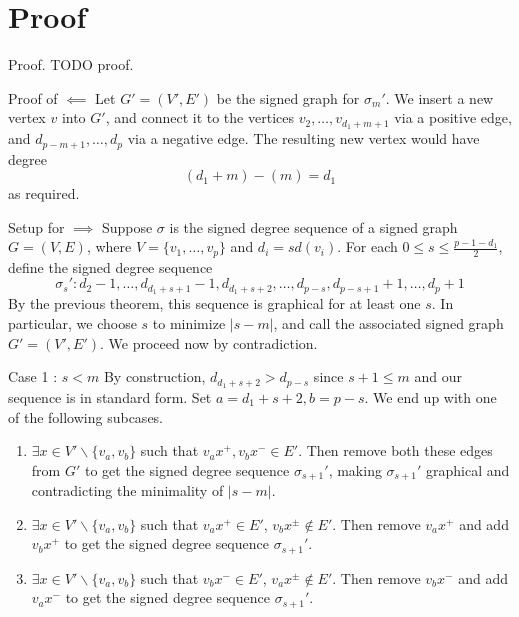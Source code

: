 \section{Proof}

\begin{frame}{Proof.}
	TODO proof.
\end{frame}

\begin{frame}{Proof of $\impliedby$}
	Let $G' = (V',E')$ be the signed graph for $\sigma_m'$. We insert a new vertex $v$ into $G'$, and connect it to the vertices $v_2,\dots,v_{d_1+m+1}$ via a positive edge, and $d_{p-m+1},\dots,d_p$ via a negative edge. The resulting new vertex would have degree
	\begin{equation*}
		(d_1+m)-(m) = d_1
	\end{equation*}
	as required.
\end{frame}

\begin{frame}{Setup for $\implies$}
	Suppose $\sigma$ is the signed degree sequence of a signed graph $G = (V,E)$, where $V = \{v_1,\dots,v_p\}$ and $d_i = sd(v_i)$. For each $0 \leq s \leq \frac{p-1-d_1}{2}$, define the signed degree sequence
	\begin{equation*}
		\sigma_s' : d_2-1,\dots,d_{d_1+s+1}-1,d_{d_1+s+2},\dots,d_{p-s},d_{p-s+1}+1,\dots,d_p+1
	\end{equation*}
	By the previous theorem, this sequence is graphical for at least one $s$. In particular, we choose $s$ to minimize $|s-m|$, and call the associated signed graph $G' = (V',E')$. We proceed now by contradiction.
\end{frame}

\begin{frame}{Case 1 : $s < m$}
	By construction, $d_{d_1+s+2} > d_{p-s}$ since $s+1 \leq m$ and our sequence is in standard form. Set $a = d_1+s+2, b = p - s$. We end up with one of the following subcases.
	\begin{enumerate}
		\item $\exists x \in V'\backslash\{v_a,v_b\}$ such that $v_ax^{+}, v_bx^{-} \in E'$. Then remove both these edges from $G'$ to get the signed degree sequence $\sigma_{s+1}'$, making $\sigma_{s+1}'$ graphical and contradicting the minimality of $|s - m|$.
		\item $\exists x \in V'\backslash\{v_a,v_b\}$ such that $v_ax^{+} \in E'$, $v_bx^{\pm} \notin E'$. Then remove $v_ax^{+}$ and add $v_bx^{+}$ to get the signed degree sequence $\sigma_{s+1}'$.
		\item $\exists x \in V'\backslash\{v_a,v_b\}$ such that $v_bx^{-} \in E'$, $v_ax^{\pm} \notin E'$. Then remove $v_bx^{-}$ and add $v_ax^{-}$ to get the signed degree sequence $\sigma_{s+1}'$.
	\end{enumerate}
\end{frame}


